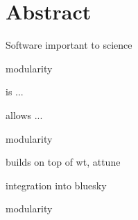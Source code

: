
\chapter*{Abstract}




Software important to science

modularity

\yaq{} is ...

\yaq{} allows ...

modularity

builds on top of wt, attune

integration into bluesky

modularity


